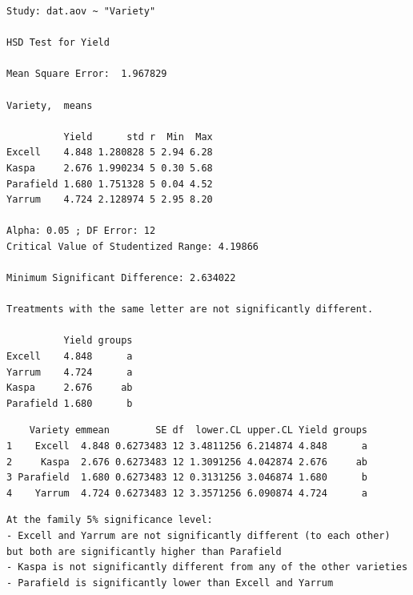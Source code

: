\documentclass[a4paper, 10pt, fleqn, twosided]{memoir}
\begin{document}
\begin{tcolorbox}[title = Example 3 Tukey's multiple comparison output]
\begin{verbatim}
Study: dat.aov ~ "Variety"

HSD Test for Yield

Mean Square Error:  1.967829

Variety,  means

          Yield      std r  Min  Max
Excell    4.848 1.280828 5 2.94 6.28
Kaspa     2.676 1.990234 5 0.30 5.68
Parafield 1.680 1.751328 5 0.04 4.52
Yarrum    4.724 2.128974 5 2.95 8.20

Alpha: 0.05 ; DF Error: 12
Critical Value of Studentized Range: 4.19866

Minimum Significant Difference: 2.634022

Treatments with the same letter are not significantly different.

          Yield groups
Excell    4.848      a
Yarrum    4.724      a
Kaspa     2.676     ab
Parafield 1.680      b

\end{verbatim}
\tcblower
\begin{verbatim}
    Variety emmean        SE df  lower.CL upper.CL Yield groups
1    Excell  4.848 0.6273483 12 3.4811256 6.214874 4.848      a
2     Kaspa  2.676 0.6273483 12 1.3091256 4.042874 2.676     ab
3 Parafield  1.680 0.6273483 12 0.3131256 3.046874 1.680      b
4    Yarrum  4.724 0.6273483 12 3.3571256 6.090874 4.724      a

\end{verbatim}
\end{tcolorbox}



\begin{tcolorbox}[title = Example 3 Prediction interpretation]
\begin{verbatim}
At the family 5% significance level:
- Excell and Yarrum are not significantly different (to each other)
but both are significantly higher than Parafield
- Kaspa is not significantly different from any of the other varieties
- Parafield is significantly lower than Excell and Yarrum
\end{verbatim}
\end{tcolorbox}
\end{document}
